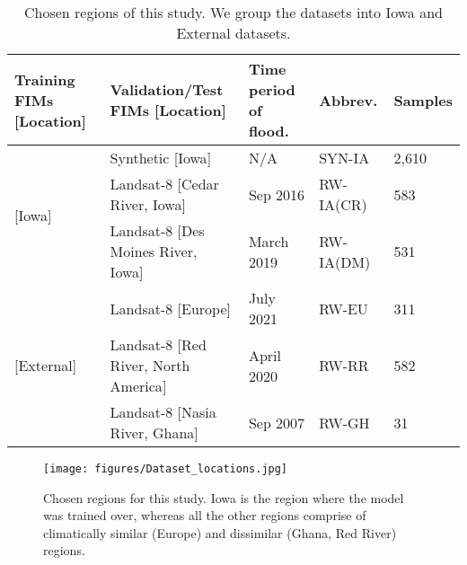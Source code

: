 
\begin{table*}
\caption{Chosen regions of this study\label{tab:dataset_locations}. We group the datasets into Iowa and External datasets. }
\centering
\begin{tabular}{lllll}
\hline
\textbf{Training FIMs  {[}Location{]}} & \textbf{Validation/Test FIMs  {[}Location{]}}            & \textbf{Time period of flood.} & \textbf{Abbrev.} & \textbf{Samples} \\ \hline
\multirow{3}{*}{{[}Iowa{]}} & Synthetic      {[}Iowa{]}                                 & N/A  & SYN-IA  & 2,610\\ %
                                       & Landsat-8     {[}Cedar River, Iowa{]}& Sep 2016 & RW-IA(CR)   &  583\\ 
                                       & Landsat-8     {[}Des Moines River, Iowa{]} & March 2019 & RW-IA(DM)   &  531\\\cline{1-5} 
\multirow{3}{*}{{[}External{]}}
                                       & Landsat-8      {[}Europe{]}                            &July 2021   & RW-EU   & 311\\ %
                                       & Landsat-8      {[}Red River, North America{]}                               & April 2020 &RW-RR  & 582 \\ 
                                       & Landsat-8      {[}Nasia River, Ghana{]}                               & Sep 2007 & RW-GH  & 31 \\ \hline

\end{tabular}

\end{table*}

\begin{figure*}[ht!]
\texttt{[image: figures/Dataset\_locations.jpg]}
\caption{ Chosen regions for this study. Iowa is the region where the model was trained over, whereas all the other regions comprise of climatically similar (Europe) and dissimilar (Ghana, Red River) regions. \label{fig:DatasetLocations}}
\end{figure*}

